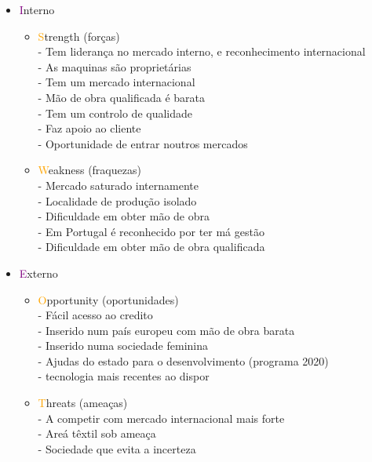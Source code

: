 \begin{itemize}
\item \textcolor{purple}{I}nterno
\begin{itemize}
\item \textcolor{orange}{S}trength (forças)\\
- Tem liderança no mercado interno, e reconhecimento internacional\\
- As maquinas são proprietárias\\
- Tem um mercado internacional\\
- Mão de obra qualificada é barata\\
- Tem um controlo de qualidade\\
- Faz apoio ao cliente\\
- Oportunidade de entrar noutros mercados
\item \textcolor{orange}{W}eakness (fraquezas)\\
- Mercado saturado internamente\\
- Localidade de produção isolado\\
- Dificuldade em obter mão de obra\\
- Em Portugal é reconhecido por ter má gestão\\
- Dificuldade em obter mão de obra qualificada\\
\end{itemize}
\item \textcolor{purple}{E}xterno
\begin{itemize}
\item \textcolor{orange}{O}pportunity (oportunidades)\\
- Fácil acesso ao credito\\
- Inserido num país europeu com mão de obra barata\\
- Inserido numa sociedade feminina\\
- Ajudas do estado para o desenvolvimento (programa 2020)\\
- tecnologia mais recentes ao dispor\\
\item \textcolor{orange}{T}hreats (ameaças)\\
- A competir com mercado internacional mais forte\\
- Areá têxtil sob ameaça\\
- Sociedade que evita a incerteza
\end{itemize}
\end{itemize}

\newpage
